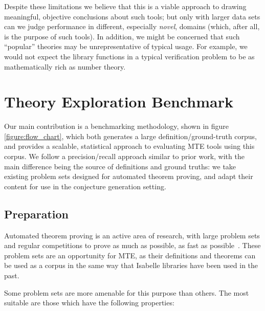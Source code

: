 Despite these limitations we believe that this is a viable approach to drawing
meaningful, objective conclusions about such tools; but only with larger data
sets can we judge performance in different, especially \emph{novel}, domains
(which, after all, is the purpose of such tools). In addition, we might be
concerned that such ``popular'' theories may be unrepresentative of typical
usage. For example, we would not expect the library functions in a typical
verification problem to be as mathematically rich as number theory.

\section{Theory Exploration Benchmark}
\label{sec:proposal}

Our main contribution is a benchmarking methodology, shown in figure
\ref{figure:flow_chart}, which both generates a large definition/ground-truth
corpus, and provides a scalable, statistical approach to evaluating MTE tools
using this corpus. We follow a precision/recall approach similar to prior work,
with the main difference being the source of definitions and ground truths: we
take existing problem sets designed for automated theorem proving, and adapt
their content for use in the conjecture generation setting.

\subsection{Preparation}
\label{section:prep}

Automated theorem proving is an active area of research, with large problem sets
and regular competitions to prove as much as possible, as fast as
possible~\cite{pelletier2002development}. These problem sets are an opportunity
for MTE, as their definitions and theorems can be used as a corpus in the same
way that Isabelle libraries have been used in the past.

Some problem sets are more amenable for this purpose than others. The most
suitable are those which have the following properties:

